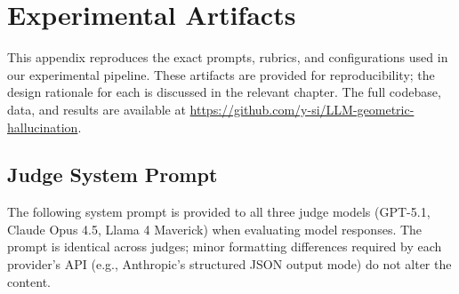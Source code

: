 \chapter{Experimental Artifacts}
\label{AppendixA}

This appendix reproduces the exact prompts, rubrics, and configurations used in our experimental pipeline. These artifacts are provided for reproducibility; the design rationale for each is discussed in the relevant chapter. The full codebase, data, and results are available at \url{https://github.com/y-si/LLM-geometric-hallucination}.

\section{Judge System Prompt}
\label{app:judge-prompt}

The following system prompt is provided to all three judge models (GPT-5.1, Claude Opus 4.5, Llama 4 Maverick) when evaluating model responses. The prompt is identical across judges; minor formatting differences required by each provider's API (e.g., Anthropic's structured JSON output mode) do not alter the content.

